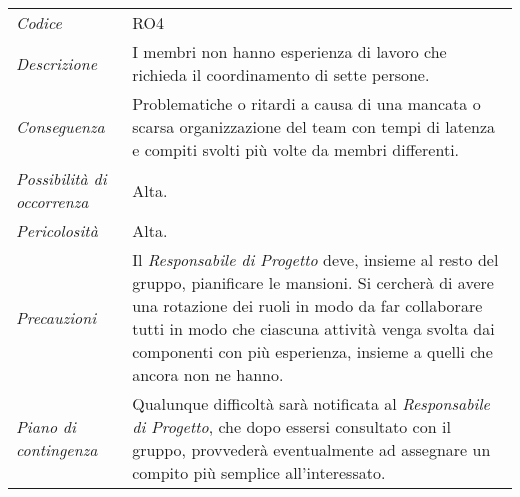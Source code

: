 {{{{{{{{	\begin{center}
		\renewcommand{\arraystretch}{1.4}
		\begin{longtable}{|p{5cm}|p{12cm}|}
			\hline
			\rowcolor{airforceblue}
			\multicolumn{2}{|c|}{\textit{Inesperienza nel coordinamento}}\\
			\hline
			\textit{Codice} & RO4 \\
			\hline
			\textit{Descrizione} & I membri non hanno esperienza di lavoro che richieda il coordinamento di sette persone.\\
			\hline
			\textit{Conseguenza} & Problematiche o ritardi a causa di una mancata o scarsa organizzazione del team con tempi di latenza e compiti svolti più volte da membri differenti. \\
			\hline
			\textit{Possibilità di occorrenza} & Alta. \\
			\hline
			\textit{Pericolosità} & Alta. \\
			\hline
			\textit{Precauzioni} & Il \textit{Responsabile di Progetto} deve, insieme al resto del gruppo, pianificare le mansioni. Si cercherà di avere una rotazione dei ruoli in modo da far collaborare tutti in modo che ciascuna attività venga svolta dai componenti con più esperienza, insieme a quelli che ancora non ne hanno.  \\
			\hline
			\textit{Piano di contingenza} & Qualunque difficoltà sarà notificata al \textit{Responsabile di Progetto}, che dopo essersi consultato con il gruppo, provvederà eventualmente ad assegnare un compito più semplice all'interessato. \\
			\hline
		\end{longtable}
	\end{center}

\def\tabularxcolumn#1{m{#1}}
{
	
}}}}}}}}}
